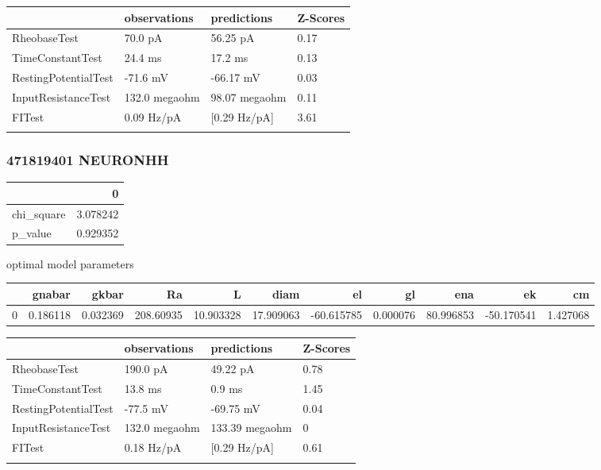 \begin{tabular}{llll}
\toprule
{} &   observations &    predictions & Z-Scores \\
\midrule
RheobaseTest         &        70.0 pA &       56.25 pA &     0.17 \\
TimeConstantTest     &        24.4 ms &        17.2 ms &     0.13 \\
RestingPotentialTest &       -71.6 mV &      -66.17 mV &     0.03 \\
InputResistanceTest  &  132.0 megaohm &  98.07 megaohm &     0.11 \\
FITest               &     0.09 Hz/pA &   [0.29 Hz/pA] &     3.61 \\
\bottomrule

\caption{}
\label{tab:conductance_482493761}
\end{tabular}


\subsubsection{471819401 NEURONHH}\begin{tabular}{lr}
\toprule
{} &         0 \\
\midrule
chi\_square &  3.078242 \\
p\_value    &  0.929352 \\
\bottomrule
\end{tabular}
optimal model parameters\begin{tabular}{lrrrrrrrrrr}
\toprule
{} &    gnabar &     gkbar &         Ra &          L &       diam &         el &        gl &        ena &         ek &        cm \\
\midrule
0 &  0.186118 &  0.032369 &  208.60935 &  10.903328 &  17.909063 & -60.615785 &  0.000076 &  80.996853 & -50.170541 &  1.427068 \\
\bottomrule
\end{tabular}
\begin{tabular}{llll}
\toprule
{} &   observations &     predictions & Z-Scores \\
\midrule
RheobaseTest         &       190.0 pA &        49.22 pA &     0.78 \\
TimeConstantTest     &        13.8 ms &          0.9 ms &     1.45 \\
RestingPotentialTest &       -77.5 mV &       -69.75 mV &     0.04 \\
InputResistanceTest  &  132.0 megaohm &  133.39 megaohm &        0 \\
FITest               &     0.18 Hz/pA &    [0.29 Hz/pA] &     0.61 \\
\bottomrule
\label{tab:conductance_471819401}

\end{tabular}

